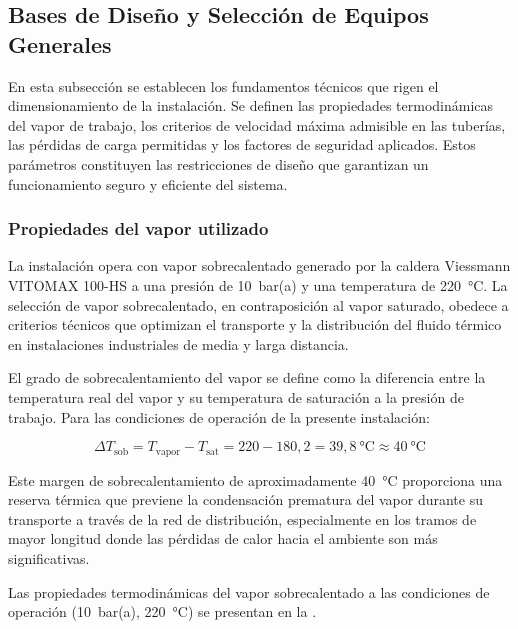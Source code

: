 \documentclass[12pt]{article}
\begin{document}
\subsection{Bases de Diseño y Selección de Equipos Generales}
\label{subsec:bases-diseno}

En esta subsección se establecen los fundamentos técnicos que rigen el dimensionamiento de la instalación. Se definen las propiedades termodinámicas del vapor de trabajo, los criterios de velocidad máxima admisible en las tuberías, las pérdidas de carga permitidas y los factores de seguridad aplicados. Estos parámetros constituyen las restricciones de diseño que garantizan un funcionamiento seguro y eficiente del sistema.

\subsubsection{Propiedades del vapor utilizado}
\label{subsubsec:propiedades-vapor}

La instalación opera con vapor sobrecalentado generado por la caldera Viessmann VITOMAX 100-HS a una presión de 10~bar(a) y una temperatura de 220~°C. La selección de vapor sobrecalentado, en contraposición al vapor saturado, obedece a criterios técnicos que optimizan el transporte y la distribución del fluido térmico en instalaciones industriales de media y larga distancia.

El grado de sobrecalentamiento del vapor se define como la diferencia entre la temperatura real del vapor y su temperatura de saturación a la presión de trabajo. Para las condiciones de operación de la presente instalación:

\begin{equation}
	\Delta T_{\text{sob}} = T_{\text{vapor}} - T_{\text{sat}} = 220 - 180{,}2 = 39{,}8 \ \text{°C} \approx 40 \ \text{°C}
	\label{eq:grado-sobrecalentamiento}
\end{equation}

Este margen de sobrecalentamiento de aproximadamente 40~°C proporciona una reserva térmica que previene la condensación prematura del vapor durante su transporte a través de la red de distribución, especialmente en los tramos de mayor longitud donde las pérdidas de calor hacia el ambiente son más significativas.

Las propiedades termodinámicas del vapor sobrecalentado a las condiciones de operación (10~bar(a), 220~°C) se presentan en la .
\end{document}
